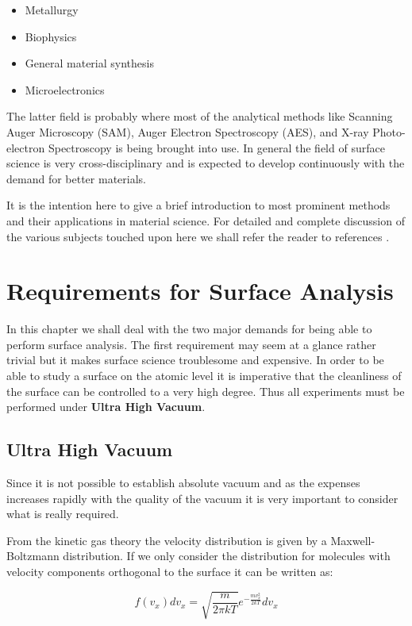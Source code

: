 \begin{itemize}
\item Metallurgy
\item Biophysics
\item General material synthesis
\item Microelectronics
\end{itemize}

The latter field is probably where most of the analytical methods like Scanning Auger Microscopy (SAM), Auger Electron Spectroscopy (AES), and X-ray Photo-electron Spectroscopy is being brought into use. In general the field of surface science is very cross-disciplinary and is expected to develop continuously with the demand for better materials.

It is the intention here to give a brief introduction to most prominent methods and their applications in material science. For detailed and complete discussion of the various subjects touched upon here we shall refer the reader to references \cite{Zangwill, Somorjai,Hudson,Niemantsverdriet, Ertl,briggs,feldman,woodruff}.

\chapter{Requirements for Surface Analysis}\label{ch:reqs}
In this chapter we shall deal with the two major demands for being able to perform surface analysis. The first requirement may seem at a glance rather trivial but it makes surface science troublesome and expensive. In order to be able to study a surface on the atomic level it is imperative that the cleanliness of the surface can be controlled to a very high degree. Thus all experiments must be performed under \textbf{Ultra High Vacuum}.

\section{Ultra High Vacuum}
Since it is not possible to establish absolute vacuum and as the expenses increases rapidly with the quality of the vacuum it is very important to consider what is really required.

From the kinetic gas theory the velocity distribution is given by a Maxwell-Boltzmann distribution. If we only consider the distribution for molecules with velocity components orthogonal to the surface it can be written as:

\begin{equation}
f(v_x)dv_x = \sqrt{\frac{m}{2\pi kT}}e^{-\frac{mv_x^2}{2kT}}dv_x
\end{equation}

